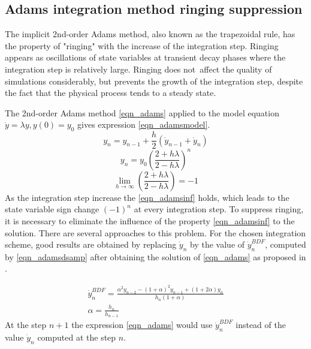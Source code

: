 \documentclass[lettersize,journal]{IEEEtran}
\begin{document}
\subsection{Adams integration method ringing suppression}

The implicit 2nd-order Adams method, also known as the trapezoidal rule, has the property of "ringing" with the increase of the integration step. Ringing appears as oscillations of state variables at transient decay phases where the integration step is relatively large. Ringing does not affect the quality of simulations considerably, but prevents the growth of the integration step, despite the fact that the physical process tends to a steady state.

The 2nd-order Adams method \eqref{eqn_adams} applied to the model equation \(\dot{y}=\lambda y, y(0)=y_0\) gives expression \eqref{eqn_adamsmodel}.
\begin{equation}
	\label{eqn_adams}
	y_n=y_{n-1}+\frac{h}{2}\left(\dot{y}_{n-1}+\dot{y}_n\right)
\end{equation}
\begin{equation}
	\label{eqn_adamsmodel}
	y_n=y_0 \left( \frac{2+h\lambda }{2-h\lambda } \right)^n
\end{equation}
\begin{equation}
	\label{eqn_adamsinf}
	\lim_{h\rightarrow\infty}{ \left( \frac{2+h \lambda }{2-h \lambda } \right) } = -1
\end{equation}
As the integration step increase the \eqref{eqn_adamsinf} holds, which leads to the state variable sign change \((-1)^n\) at every integration step. To suppress ringing, it is necessary to eliminate the influence of the property \eqref{eqn_adamsinf} to the solution. There are several approaches to this problem. For the chosen integration scheme, good results are obtained by replacing \(\dot{y}_n\) by the value of \(\dot{y}_n^{BDF}\), computed by \eqref{eqn_adamsdsamp} after obtaining the solution of \eqref{eqn_adams} as proposed in \cite{Lee2015}.

\begin{equation}
	\label{eqn_adamsdsamp}
	\begin{array}{c}
	\dot{y}_n^{BDF}=\frac{\alpha^2y_{n-2}-(1+\alpha)^2y_{n-1}+(1+2\alpha)y_n}{h_n(1+\alpha)} \\
	\alpha=\frac{h_n}{h_{n-1}}
	\end{array}
\end{equation}
At the step \(n+1\) the expression \eqref{eqn_adams} would use \(\dot{y}_n^{BDF}\) instead of the value \(\dot{y}_n\) computed at the step \(n\).
\end{document}
